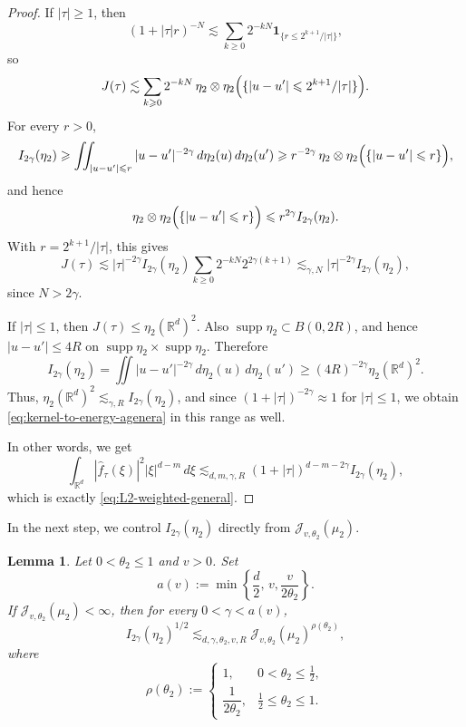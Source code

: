 \documentclass[11pt]{amsart}
\numberwithin{equation}{section}
\renewcommand{\ge}{\geqslant}
\renewcommand{\le}{\leqslant}
\newcommand{\J}{\mathcal{J}}
\newtheorem{lemma}[theorem]{Lemma}
\newcommand{\spt}{\operatorname{supp}}
\theoremstyle{plain}
\theoremstyle{remark}
\newcommand{\Rd}{\mathbb{R}^d}
\begin{document}
\begin{proof}
If $|\tau|\ge 1$, then
\[
(1+|\tau|r)^{-N}\lesssim \sum_{k\ge 0}2^{-kN}\mathbf 1_{\{r\le 2^{k+1}/|\tau|\}},
\]
so
\[
J(\tau)\lesssim
\sum_{k\ge 0}2^{-kN}\,
\eta_2\otimes\eta_2\Bigl(\{|u-u'|\le 2^{k+1}/|\tau|\}\Bigr).
\]
For every $r>0$,
\[
I_{2\gamma}(\eta_2)
\ge
\iint_{|u-u'|\le r}|u-u'|^{-2\gamma}\,d\eta_2(u)\,d\eta_2(u')
\ge
r^{-2\gamma}\,\eta_2\otimes\eta_2\Bigl(\{|u-u'|\le r\}\Bigr),
\]
and hence
\[
\eta_2\otimes\eta_2\Bigl(\{|u-u'|\le r\}\Bigr)
\le r^{2\gamma}I_{2\gamma}(\eta_2).
\]
With $r=2^{k+1}/|\tau|$, this gives
\[
J(\tau)\lesssim
|\tau|^{-2\gamma}I_{2\gamma}(\eta_2)
\sum_{k\ge 0}2^{-kN}2^{2\gamma(k+1)}
\lesssim_{\gamma,N}
|\tau|^{-2\gamma}I_{2\gamma}(\eta_2),
\]
since $N>2\gamma$.

If $|\tau|\le 1$, then $J(\tau)\le \eta_2(\Rd)^2$. Also
$\spt\eta_2\subset B(0,2R)$, and hence $|u-u'|\le 4R$ on
$\spt\eta_2\times\spt\eta_2$. Therefore
\[
I_{2\gamma}(\eta_2)
=
\iint |u-u'|^{-2\gamma}\,d\eta_2(u)\,d\eta_2(u')
\ge
(4R)^{-2\gamma}\eta_2(\Rd)^2.
\]
Thus, $\eta_2(\Rd)^2\lesssim_{\gamma,R} I_{2\gamma}(\eta_2)$, and since
$(1+|\tau|)^{-2\gamma}\approx 1$ for $|\tau|\le 1$, we obtain
\eqref{eq:kernel-to-energy-agenera} in this range as well.

In other words, we get
\[
\int_{\Rd}|\widehat f_{\tau}(\xi)|^2|\xi|^{d-m}\,d\xi
\lesssim_{d,m,\gamma,R}
(1+|\tau|)^{d-m-2\gamma}I_{2\gamma}(\eta_2),
\]
which is exactly \eqref{eq:L2-weighted-general}.
\end{proof}


In the next step, we control $I_{2\gamma}(\eta_2)$ directly from $\J_{v,\theta_2}(\mu_2)$.


\begin{lemma}\label{lem:eta-energy-general-theta}
Let $0<\theta_2\le 1$ and $v>0$.
Set
\[
a(v):=\min\!\left\{\frac d2,\, v, \frac{v}{2\theta_2}\right\}.
\]
If $\J_{v,\theta_2}(\mu_2)<\infty$, then for every $0<\gamma<a(v)$,
\begin{equation}\label{eq:eta-energy-general-theta}
I_{2\gamma}(\eta_2)^{1/2}
\lesssim_{d,\gamma,\theta_2,v,R}
\J_{v,\theta_2}(\mu_2)^{\rho(\theta_2)},
\end{equation}
where \[
\rho(\theta_2):=
\begin{cases}
1, & 0<\theta_2\le \frac12,\\[1ex]
\dfrac{1}{2\theta_2}, & \frac12\le \theta_2\le 1.
\end{cases}
\]
\end{lemma}
\end{document}
